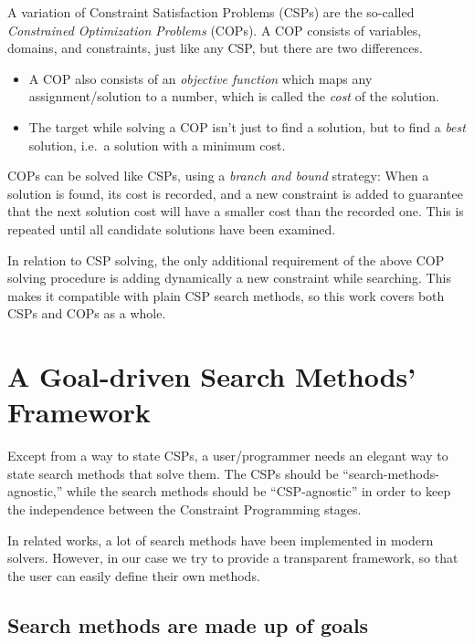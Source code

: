 \documentclass{ws-ijait}
\begin{document}
A variation of Constraint Satisfaction Problems (CSPs) are
the so-called \emph{Constrained Optimization Problems}
(COPs). A COP consists of variables, domains, and
constraints, just like any CSP, but there are two
differences.
\begin{itemize}
  \item A COP also consists of an \emph{objective function}
        which maps any assignment\slash solution to a
        number, which is called the \emph{cost} of the
        solution.
  \item The target while solving a COP isn't just to find a
        solution, but to find a \emph{best} solution, i.e.\ 
        a solution with a minimum cost.
\end{itemize}
COPs can be solved like CSPs, using a \emph{branch and
bound} strategy: When a solution is found, its cost is
recorded, and a new constraint is added to guarantee that
the next solution cost will have a smaller cost than the
recorded one. This is repeated until all candidate solutions
have been examined.

In relation to CSP solving, the only additional requirement
of the above COP solving procedure is adding dynamically a
new constraint while searching. This makes it compatible
with plain CSP search methods, so this work covers both CSPs
and COPs as a whole.


\section{A Goal-driven Search Methods'
         Framework\label{search-framework}}

Except from a way to state CSPs, a user\slash programmer
needs an elegant way to state search methods that solve
them. The CSPs should be ``search-methods-agnostic,'' while
the search methods should be ``CSP-agnostic'' in order to
keep the independence between the Constraint Programming
stages.

In related works, a lot of search methods have been
implemented in modern solvers.\cite{Gecode2017} However, in
our case we try to provide a transparent framework, so that
the user can easily define their own methods.

\subsection{Search methods are made up of goals}
\end{document}
